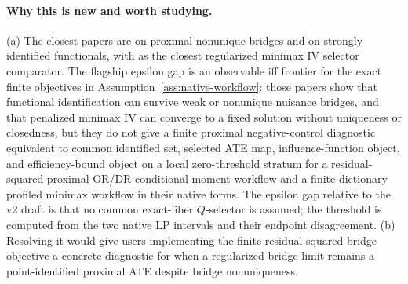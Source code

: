 \documentclass[11pt]{article}
\theoremstyle{definition}
\theoremstyle{plain}
\theoremstyle{remark}
\begin{document}
\paragraph{Why this is new and worth studying.}
(a) The closest papers are \citet{ZhangLiMiaoTchetgen2023SPL} on proximal
nonunique bridges and
\citet{BennettKallusMaoNeweySyrgkanisUehara2023COLT} on strongly identified
functionals, with
\citet{BennettKallusMaoNeweySyrgkanisUehara2023MinimaxIV} as the closest
regularized minimax IV selector comparator.  The flagship epsilon gap is an
observable iff frontier for the exact finite objectives in
Assumption~\ref{ass:native-workflow}: those papers show that functional
identification can survive weak or nonunique nuisance bridges, and that
penalized minimax IV can converge to a fixed solution without uniqueness or
closedness, but they do not give a finite proximal negative-control diagnostic
equivalent to common identified set, selected ATE map, influence-function
object, and efficiency-bound object on a local zero-threshold stratum for a residual-squared proximal OR/DR
conditional-moment workflow and a finite-dictionary profiled minimax workflow
in their native forms.  The
epsilon gap relative to the v2 draft is that no common exact-fiber
\(Q\)-selector is assumed; the
threshold is computed from the two native LP intervals and their endpoint
disagreement.  (b) Resolving it would give
\citet{CuiPuShiMiaoTchetgen2024JASA} users implementing the finite
residual-squared bridge objective a concrete diagnostic for when a
regularized bridge limit remains a point-identified proximal ATE despite
bridge nonuniqueness.
\end{document}
